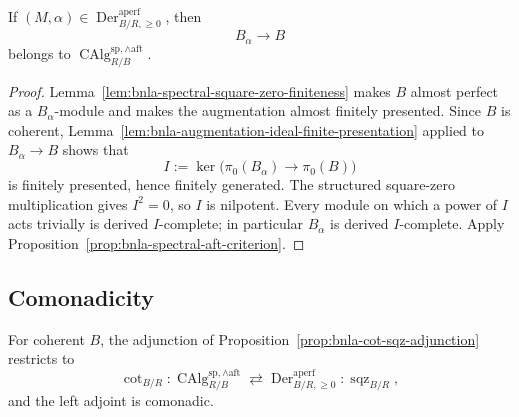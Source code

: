 \begin{lemma}
\label{lem:bnla-sqz-complete-aft}
If $(M,\alpha)\in
\operatorname{Der}^{\mathrm{aperf}}_{B/R,\geq0}$, then
\[
    B_\alpha\longrightarrow B
\]
belongs to
$\operatorname{CAlg}^{\mathrm{sp},\wedge\mathrm{aft}}_{R/B}$.
\end{lemma}

\begin{proof}
Lemma~\ref{lem:bnla-spectral-square-zero-finiteness} makes $B$ almost perfect
as a $B_\alpha$-module and makes the augmentation almost finitely presented.
Since $B$ is coherent, Lemma~\ref{lem:bnla-augmentation-ideal-finite-presentation}
applied to $B_\alpha\to B$ shows that
\[
    I:=\ker\bigl(\pi_0(B_\alpha)\to\pi_0(B)\bigr)
\]
is finitely presented, hence finitely generated.  The structured square-zero
multiplication gives $I^2=0$, so $I$ is nilpotent.  Every module on which a
power of $I$ acts trivially is derived $I$-complete; in particular
$B_\alpha$ is derived $I$-complete.  Apply
Proposition~\ref{prop:bnla-spectral-aft-criterion}.
\end{proof}

\subsection{Comonadicity}

\begin{theorem}
\label{thm:bnla-spectral-cot-sqz-comonadic}
For coherent $B$, the adjunction of
Proposition~\ref{prop:bnla-cot-sqz-adjunction} restricts to
\[
    \operatorname{cot}_{B/R}:
    \operatorname{CAlg}^{\mathrm{sp},\wedge\mathrm{aft}}_{R/B}
    \rightleftarrows
    \operatorname{Der}^{\mathrm{aperf}}_{B/R,\geq0}:
    \operatorname{sqz}_{B/R},
\]
and the left adjoint is comonadic.
\end{theorem}

